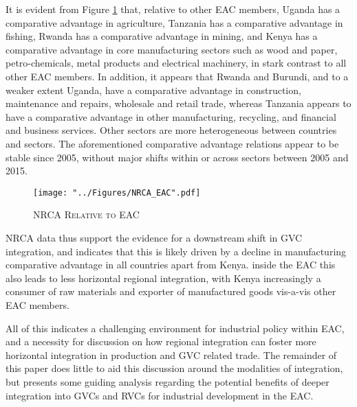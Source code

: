 \documentclass[a4paper]{article}
\begin{document}
It is evident from Figure \ref{fig:NRCA_EAC} that, relative to other EAC members, Uganda has a comparative advantage in agriculture, Tanzania has a comparative advantage in fishing, Rwanda has a comparative advantage in mining, and Kenya has a comparative advantage in core manufacturing sectors such as wood and paper, petro-chemicals, metal products and electrical machinery, in stark contrast to all other EAC members. In addition, it appears that Rwanda and Burundi, and to a weaker extent Uganda, have a comparative advantage in construction, maintenance and repairs, wholesale and retail trade, whereas Tanzania appears to have a comparative advantage in other manufacturing, recycling, and financial and business services. Other sectors are more heterogeneous between countries and sectors. The aforementioned comparative advantage relations appear to be stable since 2005, without major shifts within or across sectors between 2005 and 2015. \newline 

\begin{figure}[h!]
\centering
\caption{\label{fig:NRCA_EAC}\textsc{NRCA Relative to EAC}}
\texttt{[image: "../Figures/NRCA\_EAC".pdf]} %
\end{figure}
\FloatBarrier

NRCA data thus support the evidence for a downstream shift in GVC integration, and indicates that this is likely driven by a decline in manufacturing comparative advantage in all countries apart from Kenya. inside the EAC this also leads to less horizontal regional integration, with Kenya increasingly a consumer of raw materials and exporter of manufactured goods vis-a-vis other EAC members. \newline

All of this indicates a challenging environment for industrial policy within EAC, and a necessity for discussion on how regional integration can foster more horizontal integration in production and GVC related trade. The remainder of this paper does little to aid this discussion around the modalities of integration, but presents some guiding analysis regarding the potential benefits of deeper integration into GVCs and RVCs for industrial development in the EAC. 


\end{document}

